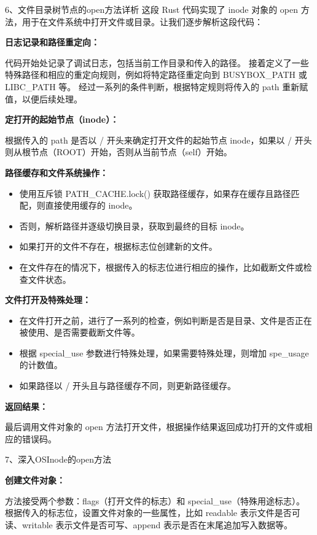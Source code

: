 6、文件目录树节点的open方法详析
这段 Rust 代码实现了 inode 对象的 open 方法，用于在文件系统中打开文件或目录。让我们逐步解析这段代码：

\textbf{日志记录和路径重定向：}

代码开始处记录了调试日志，包括当前工作目录和传入的路径。
接着定义了一些特殊路径和相应的重定向规则，例如将特定路径重定向到 BUSYBOX_PATH 或 LIBC_PATH 等。
经过一系列的条件判断，根据特定规则将传入的 path 重新赋值，以便后续处理。

\textbf{定打开的起始节点（inode）：}

根据传入的 path 是否以 / 开头来确定打开文件的起始节点 inode，如果以 / 开头则从根节点（ROOT）开始，否则从当前节点（self）开始。

\textbf{路径缓存和文件系统操作：}

\begin{itemize}
    \item 使用互斥锁 PATH_CACHE.lock() 获取路径缓存，如果存在缓存且路径匹配，则直接使用缓存的 inode。\
    \item 否则，解析路径并逐级切换目录，获取到最终的目标 inode。
    \item 如果打开的文件不存在，根据标志位创建新的文件。
    \item 在文件存在的情况下，根据传入的标志位进行相应的操作，比如截断文件或检查文件状态。
\end{itemize}

\textbf{文件打开及特殊处理：}

\begin{itemize}
    \item 在文件打开之前，进行了一系列的检查，例如判断是否是目录、文件是否正在被使用、是否需要截断文件等。
    \item 根据 special_use 参数进行特殊处理，如果需要特殊处理，则增加 spe_usage 的计数值。
    \item 如果路径以 / 开头且与路径缓存不同，则更新路径缓存。
\end{itemize}

\textbf{返回结果：}

最后调用文件对象的 open 方法打开文件，根据操作结果返回成功打开的文件或相应的错误码。

7、深入OSInode的open方法

\textbf{创建文件对象：}

方法接受两个参数：flags（打开文件的标志）和 special_use（特殊用途标志）。
根据传入的标志位，设置文件对象的一些属性，比如 readable 表示文件是否可读、writable 表示文件是否可写、append 表示是否在末尾追加写入数据等。

